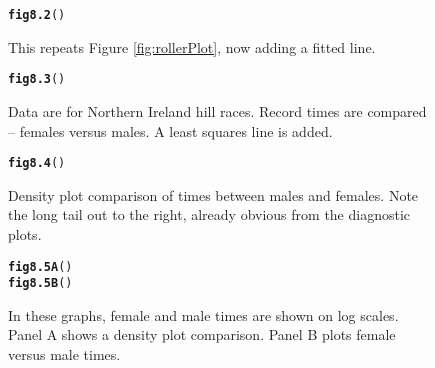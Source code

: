 \documentclass[12pt, a4paper,  BCOR=8.25mm, DIV=15]{scrartcl}\usepackage[]{graphicx}\usepackage[]{color}
\makeatletter
\newcommand{\hlstd}[1]{\textcolor[rgb]{0.345,0.345,0.345}{#1}}%
\newcommand{\hlkwd}[1]{\textcolor[rgb]{0.737,0.353,0.396}{\textbf{#1}}}%
\newenvironment{kframe}{%
 \def\at@end@of@kframe{}%
 \ifinner\ifhmode%
  \def\at@end@of@kframe{\end{minipage}}%
  \begin{minipage}{\columnwidth}%
 \fi\fi%
 \def\FrameCommand##1{\hskip\@totalleftmargin \hskip-\fboxsep
 \colorbox{shadecolor}{##1}\hskip-\fboxsep
     \hskip-\linewidth \hskip-\@totalleftmargin \hskip\columnwidth}%
 \MakeFramed {\advance\hsize-\width
   \@totalleftmargin\z@ \linewidth\hsize
   \@setminipage}}%
 {\par\unskip\endMakeFramed%
 \at@end@of@kframe}
\newenvironment{knitrout}{}{} %
\makeatother
\begin{document}
\begin{figure}[H]
\begin{knitrout}
\color{fgcolor}\begin{kframe}
\begin{alltt}
\hlkwd{fig8.2}\hlstd{()}
\end{alltt}
\end{kframe}
\end{knitrout}
\caption{This repeats Figure \ref{fig:rollerPlot}, now adding a fitted
  line.}\label{fig:rollerPlot-withline}
\end{figure}

\begin{figure}[H]
\begin{knitrout}
\color{fgcolor}\begin{kframe}
\begin{alltt}
\hlkwd{fig8.3}\hlstd{()}
\end{alltt}
\end{kframe}
\end{knitrout}
  \caption{Data are for Northern Ireland hill races.
    Record times are compared -- females versus males.  A least squares line
    is added.}\label{fig:nimff}
\end{figure}

\begin{figure}[H]
\begin{knitrout}
\color{fgcolor}\begin{kframe}
\begin{alltt}
\hlkwd{fig8.4}\hlstd{()}
\end{alltt}
\end{kframe}
\end{knitrout}
  \caption{Density plot comparison of times between males
    and females.  Note the long tail out to the right,
  already obvious from the diagnostic plots.}\label{fig:skewtime}
\end{figure}

\begin{figure}[H]
\begin{knitrout}
\color{fgcolor}\begin{kframe}
\begin{alltt}
\hlkwd{fig8.5A}\hlstd{()}
\hlkwd{fig8.5B}\hlstd{()}
\end{alltt}
\end{kframe}
\end{knitrout}
  \caption{In these graphs, female and male times are shown on log scales.
    Panel A shows a density plot comparison. Panel B plots female versus
    male times.
  }\label{fig:skewtime-log}
\end{figure}
\end{document}
